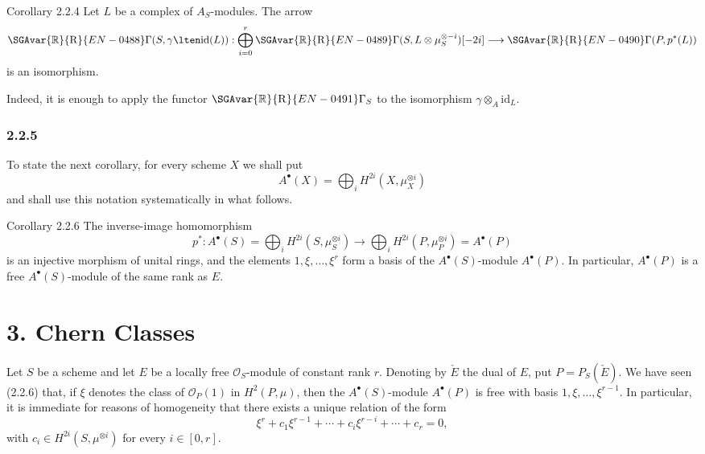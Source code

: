 \begin{statement}{Corollary 2.2.4}
Let $L$ be a complex of $A_S$-modules. The arrow
\[
\SGAvar{\mathbb{R}}{\mathrm R}{EN-0488}\Gamma(S,\gamma\lten\mathrm{id}(L)):
\bigoplus_{i=0}^r \SGAvar{\mathbb{R}}{\mathrm R}{EN-0489}\Gamma(S,L\otimes\mu_S^{\otimes -i})[-2i]
\longrightarrow
\SGAvar{\mathbb{R}}{\mathrm R}{EN-0490}\Gamma(P,p^*(L))
\]
is an isomorphism.
\end{statement}

Indeed, it is enough to apply the functor $\SGAvar{\mathbb{R}}{\mathrm R}{EN-0491}\Gamma_S$ to the isomorphism $\gamma\otimes_A\mathrm{id}_L$.

\subsubsection*{2.2.5}
To state the next corollary, for every scheme $X$ we shall put
\[
A^\bullet(X)=\bigoplus_i H^{2i}(X,\mu_X^{\otimes i})
\]
and shall use this notation systematically in what follows.

\begin{statement}{Corollary 2.2.6}
The inverse-image homomorphism
\[
p^*:A^\bullet(S)=\bigoplus_i H^{2i}(S,\mu_S^{\otimes i})
\longrightarrow
\bigoplus_i H^{2i}(P,\mu_P^{\otimes i})=A^\bullet(P)
\]
is an injective morphism of unital rings, and the elements $1,\xi,\ldots,\xi^r$ form a basis of the $A^\bullet(S)$-module $A^\bullet(P)$. In particular, $A^\bullet(P)$ is a free $A^\bullet(S)$-module of the same rank as $E$.
\end{statement}

\section*{3. Chern Classes}

Let $S$ be a scheme and let $E$ be a locally free $\mathcal O_S$-module of constant rank $r$. Denoting by $\check E$ the dual of $E$, put $P=P_S(\check E)$. We have seen (2.2.6) that, if $\xi$ denotes the class of $\mathcal O_P(1)$ in $H^2(P,\mu)$, then the $A^\bullet(S)$-module $A^\bullet(P)$ is free with basis $1,\xi,\ldots,\xi^{r-1}$. In particular, it is immediate for reasons of homogeneity that there exists a unique relation of the form
\[
\xi^r+c_1\xi^{r-1}+\cdots+c_i\xi^{r-i}+\cdots+c_r=0,
\tag{3.1}
\]
with $c_i\in H^{2i}(S,\mu^{\otimes i})$ for every $i\in[0,r]$.

